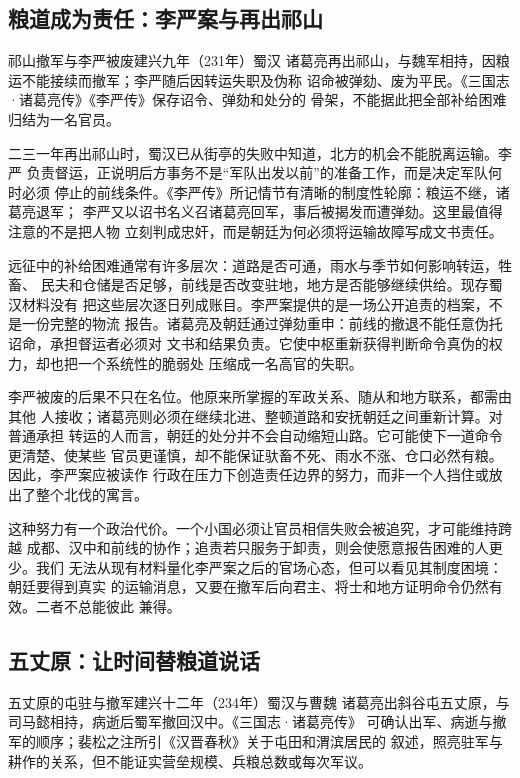 \subsection{粮道成为责任：李严案与再出祁山}

\begin{event}{祁山撤军与李严被废}{建兴九年（231年）}{蜀汉}{}
诸葛亮再出祁山，与魏军相持，因粮运不能接续而撤军；李严随后因转运失职及伪称
诏命被弹劾、废为平民。《三国志·诸葛亮传》《李严传》保存诏令、弹劾和处分的
骨架，不能据此把全部补给困难归结为一名官员。
\end{event}

二三一年再出祁山时，蜀汉已从街亭的失败中知道，北方的机会不能脱离运输。李严
负责督运，正说明后方事务不是“军队出发以前”的准备工作，而是决定军队何时必须
停止的前线条件。《李严传》所记情节有清晰的制度性轮廓：粮运不继，诸葛亮退军；
李严又以诏书名义召诸葛亮回军，事后被揭发而遭弹劾。这里最值得注意的不是把人物
立刻判成忠奸，而是朝廷为何必须将运输故障写成文书责任。

远征中的补给困难通常有许多层次：道路是否可通，雨水与季节如何影响转运，牲畜、
民夫和仓储是否足够，前线是否改变驻地，地方是否能够继续供给。现存蜀汉材料没有
把这些层次逐日列成账目。李严案提供的是一场公开追责的档案，不是一份完整的物流
报告。诸葛亮及朝廷通过弹劾重申：前线的撤退不能任意伪托诏命，承担督运者必须对
文书和结果负责。它使中枢重新获得判断命令真伪的权力，却也把一个系统性的脆弱处
压缩成一名高官的失职。

李严被废的后果不只在名位。他原来所掌握的军政关系、随从和地方联系，都需由其他
人接收；诸葛亮则必须在继续北进、整顿道路和安抚朝廷之间重新计算。对普通承担
转运的人而言，朝廷的处分并不会自动缩短山路。它可能使下一道命令更清楚、使某些
官员更谨慎，却不能保证驮畜不死、雨水不涨、仓口必然有粮。因此，李严案应被读作
行政在压力下创造责任边界的努力，而非一个人挡住或放出了整个北伐的寓言。

这种努力有一个政治代价。一个小国必须让官员相信失败会被追究，才可能维持跨越
成都、汉中和前线的协作；追责若只服务于卸责，则会使愿意报告困难的人更少。我们
无法从现有材料量化李严案之后的官场心态，但可以看见其制度困境：朝廷要得到真实
的运输消息，又要在撤军后向君主、将士和地方证明命令仍然有效。二者不总能彼此
兼得。

\subsection{五丈原：让时间替粮道说话}

\begin{event}{五丈原的屯驻与撤军}{建兴十二年（234年）}{蜀汉与曹魏}{}
诸葛亮出斜谷屯五丈原，与司马懿相持，病逝后蜀军撤回汉中。《三国志·诸葛亮传》
可确认出军、病逝与撤军的顺序；裴松之注所引《汉晋春秋》关于屯田和渭滨居民的
叙述，照亮驻军与耕作的关系，但不能证实营垒规模、兵粮总数或每次军议。
\end{event}

